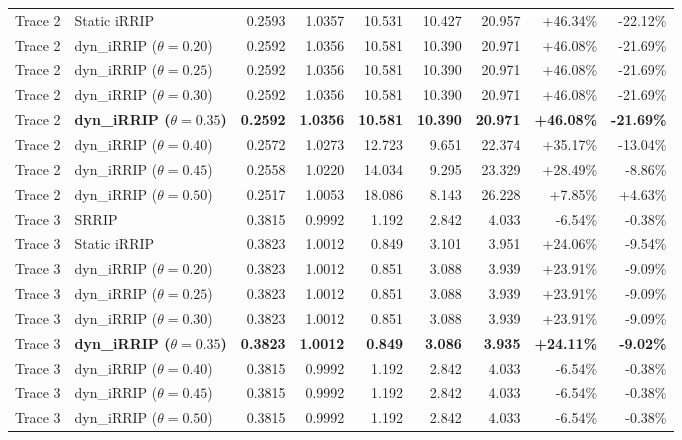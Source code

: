 \documentclass[11pt,a4paper]{article}
\begin{document}
\begin{table}[H]
{\begin{tabular}{llrrrrrrr}
Trace 2 & Static iRRIP           & 0.2593 & 1.0357 & 10.531 & 10.427 & 20.957 & +46.34\% & -22.12\% \\
Trace 2 & dyn\_iRRIP ($\theta=0.20$) & 0.2592 & 1.0356 & 10.581 & 10.390 & 20.971 & +46.08\% & -21.69\% \\
Trace 2 & dyn\_iRRIP ($\theta=0.25$) & 0.2592 & 1.0356 & 10.581 & 10.390 & 20.971 & +46.08\% & -21.69\% \\
Trace 2 & dyn\_iRRIP ($\theta=0.30$) & 0.2592 & 1.0356 & 10.581 & 10.390 & 20.971 & +46.08\% & -21.69\% \\
Trace 2 & \textbf{dyn\_iRRIP ($\theta=0.35$)} & \textbf{0.2592} & \textbf{1.0356} & \textbf{10.581} & \textbf{10.390} & \textbf{20.971} & \textbf{+46.08\%} & \textbf{-21.69\%} \\
Trace 2 & dyn\_iRRIP ($\theta=0.40$) & 0.2572 & 1.0273 & 12.723 & 9.651 & 22.374 & +35.17\% & -13.04\% \\
Trace 2 & dyn\_iRRIP ($\theta=0.45$) & 0.2558 & 1.0220 & 14.034 & 9.295 & 23.329 & +28.49\% & -8.86\% \\
Trace 2 & dyn\_iRRIP ($\theta=0.50$) & 0.2517 & 1.0053 & 18.086 & 8.143 & 26.228 & +7.85\% & +4.63\% \\
\midrule
Trace 3 & SRRIP                  & 0.3815 & 0.9992 & 1.192 & 2.842 & 4.033 & -6.54\% & -0.38\% \\
Trace 3 & Static iRRIP           & 0.3823 & 1.0012 & 0.849 & 3.101 & 3.951 & +24.06\% & -9.54\% \\
Trace 3 & dyn\_iRRIP ($\theta=0.20$) & 0.3823 & 1.0012 & 0.851 & 3.088 & 3.939 & +23.91\% & -9.09\% \\
Trace 3 & dyn\_iRRIP ($\theta=0.25$) & 0.3823 & 1.0012 & 0.851 & 3.088 & 3.939 & +23.91\% & -9.09\% \\
Trace 3 & dyn\_iRRIP ($\theta=0.30$) & 0.3823 & 1.0012 & 0.851 & 3.088 & 3.939 & +23.91\% & -9.09\% \\
Trace 3 & \textbf{dyn\_iRRIP ($\theta=0.35$)} & \textbf{0.3823} & \textbf{1.0012} & \textbf{0.849} & \textbf{3.086} & \textbf{3.935} & \textbf{+24.11\%} & \textbf{-9.02\%} \\
Trace 3 & dyn\_iRRIP ($\theta=0.40$) & 0.3815 & 0.9992 & 1.192 & 2.842 & 4.033 & -6.54\% & -0.38\% \\
Trace 3 & dyn\_iRRIP ($\theta=0.45$) & 0.3815 & 0.9992 & 1.192 & 2.842 & 4.033 & -6.54\% & -0.38\% \\
Trace 3 & dyn\_iRRIP ($\theta=0.50$) & 0.3815 & 0.9992 & 1.192 & 2.842 & 4.033 & -6.54\% & -0.38\% \\
\bottomrule
\end{tabular}%
}
\end{table}
\end{document}
